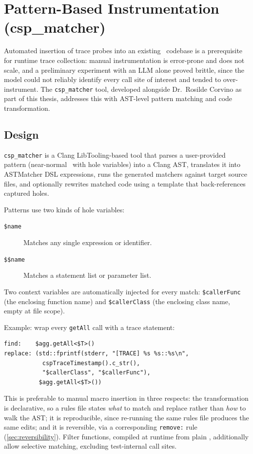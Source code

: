 \section{Pattern-Based Instrumentation (csp\_matcher)}\label{sec:csp-matcher}

Automated insertion of trace probes into an existing \Cpp\ codebase is a
prerequisite for runtime trace collection: manual instrumentation is
error-prone and does not scale, and a preliminary experiment with an LLM
alone proved brittle, since the model could not reliably identify every
call site of interest and tended to over-instrument. The
\texttt{csp\_matcher} tool, developed alongside Dr.~Rosilde Corvino as
part of this thesis, addresses this with AST-level pattern matching and
code transformation.

\subsection{Design}

\texttt{csp\_matcher} is a Clang LibTooling-based tool that parses a
user-provided pattern (near-normal \Cpp\ with hole variables) into a
Clang \ac{AST}, translates it into ASTMatcher DSL expressions, runs the
generated matchers against target source files, and optionally rewrites
matched code using a template that back-references captured holes.

Patterns use two kinds of hole variables:
\begin{description}
  \item[\texttt{\$name}] Matches any single expression or identifier.
  \item[\texttt{\$\$name}] Matches a statement list or parameter list.
\end{description}

Two context variables are automatically injected for every match:
\texttt{\$callerFunc} (the enclosing function name) and
\texttt{\$callerClass} (the enclosing class name, empty at file scope).

Example: wrap every \texttt{getAll} call with a trace statement:

\begin{verbatim}
find:    $agg.getAll<$T>()
replace: (std::fprintf(stderr, "[TRACE] %s %s::%s\n",
           cspTraceTimestamp().c_str(),
           "$callerClass", "$callerFunc"),
          $agg.getAll<$T>())
\end{verbatim}

This is preferable to manual macro insertion in three respects: the
transformation is declarative, so a rules file states \emph{what} to
match and replace rather than \emph{how} to walk the AST; it is
reproducible, since re-running the same rules file produces the same
edits; and it is reversible, via a corresponding \texttt{remove:} rule
(\cref{sec:reversibility}). Filter functions, compiled at runtime from
plain \Cpp, additionally allow selective matching, \eg excluding
test-internal call sites.

